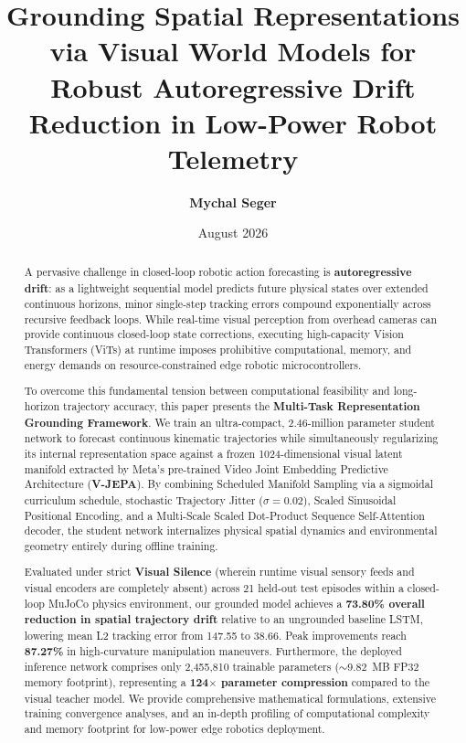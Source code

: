 \documentclass[11pt,a4paper]{article}
\title{\textbf{Grounding Spatial Representations via Visual World Models for Robust Autoregressive Drift Reduction in Low-Power Robot Telemetry}}
\author{
    \textbf{Mychal Seger} \\
}
\date{August 2026}
\begin{document}
\maketitle

\begin{abstract}
A pervasive challenge in closed-loop robotic action forecasting is \textbf{autoregressive drift}: as a lightweight sequential model predicts future physical states over extended continuous horizons, minor single-step tracking errors compound exponentially across recursive feedback loops. While real-time visual perception from overhead cameras can provide continuous closed-loop state corrections, executing high-capacity Vision Transformers (ViTs) at runtime imposes prohibitive computational, memory, and energy demands on resource-constrained edge robotic microcontrollers. 

To overcome this fundamental tension between computational feasibility and long-horizon trajectory accuracy, this paper presents the \textbf{Multi-Task Representation Grounding Framework}. We train an ultra-compact, 2.46-million parameter student network to forecast continuous kinematic trajectories while simultaneously regularizing its internal representation space against a frozen 1024-dimensional visual latent manifold extracted by Meta's pre-trained Video Joint Embedding Predictive Architecture (\textbf{V-JEPA}). By combining Scheduled Manifold Sampling via a sigmoidal curriculum schedule, stochastic Trajectory Jitter ($\sigma=0.02$), Scaled Sinusoidal Positional Encoding, and a Multi-Scale Scaled Dot-Product Sequence Self-Attention decoder, the student network internalizes physical spatial dynamics and environmental geometry entirely during offline training. 

Evaluated under strict \textbf{Visual Silence} (wherein runtime visual sensory feeds and visual encoders are completely absent) across 21 held-out test episodes within a closed-loop MuJoCo physics environment, our grounded model achieves a \textbf{73.80\% overall reduction in spatial trajectory drift} relative to an ungrounded baseline LSTM, lowering mean L2 tracking error from 147.55 to 38.66. Peak improvements reach \textbf{87.27\%} in high-curvature manipulation maneuvers. Furthermore, the deployed inference network comprises only 2,455,810 trainable parameters ($\sim$9.82~MB FP32 memory footprint), representing a \textbf{124$\times$ parameter compression} compared to the visual teacher model. We provide comprehensive mathematical formulations, extensive training convergence analyses, and an in-depth profiling of computational complexity and memory footprint for low-power edge robotics deployment.
\end{abstract}
\end{document}
